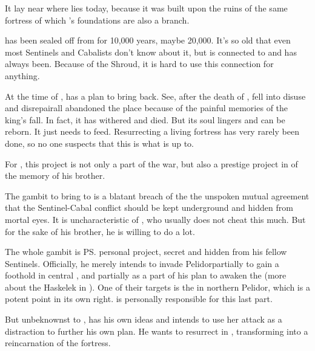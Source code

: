 It lay near where \Malcur lies today, because it was built upon the ruins of the same  fortress of which \Malcur's foundations are also a branch. 

\Nithdornazsh{} has been sealed off from \Miith{} for 10,000 years, maybe 20,000. It's so old that even most Sentinels and Cabalists don't know about it, but \Malcur is connected to \Nithdornazsh{} and has always been. Because of the Shroud, it is hard to use this connection for anything. 

At the time of \TwilightAngelRememberEmph, \HriistD{} has a plan to bring \Nithdornazsh{} back. See, after the death of \Nexagglachel, \Nithdornazsh{} fell into disuse and disrepair\dash all \dragons{} abandoned the place because of the painful memories of the king's fall. In fact, it has withered and died. But its soul lingers and can be reborn. It just needs to feed. Resurrecting a living fortress has very rarely been done, so no one suspects that this is what \HriistD{} is up to. 

For \HriistD, this project is not only a part of the war, but also a prestige project in \honour of the memory of his brother. 

The gambit to bring \Nithdornazsh{} to \Miith{} is a blatant breach of the \charade\dash the unspoken mutual agreement that the Sentinel-Cabal conflict should be kept underground and hidden from mortal eyes. It is uncharacteristic of \HriistD{}, who usually does not cheat this much. But for the sake of his brother, he is willing to do a lot. 

The whole \Nithdornazsh{} gambit is \ps{\HriistD}{} personal project, secret and hidden from his fellow Sentinels. 
Officially, he merely intends to invade Pelidor\dash partially to gain a foothold in central \Velcad{}, and partially as a part of his plan to awaken the \Haskelek{} (more about the Haskelek in \CarzainWithRedcorBook). 
One of their targets is the  in northern Pelidor, which is a potent \nexus{} point in its own right. 
\Nzessuacrith{} is personally responsible for this last part. 

But unbeknownst to \Nzessuacrith, \HriistD{} has his own ideas and intends to use her attack as a distraction to further his own plan. He wants to resurrect \Nithdornazsh{} in \Malcur, transforming \Malcur into a reincarnation of the \draconic{} fortress. 









